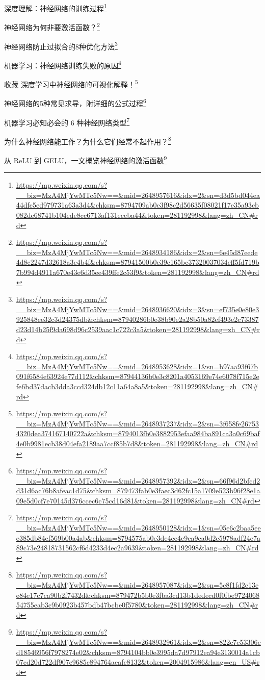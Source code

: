 \documentclass[]{ctexbook}
\renewcommand{\href}[2]{#2\footnote{\url{#1}}}
\begin{document}
\href{https://mp.weixin.qq.com/s?__biz=MzA4MjYwMTc5Nw==\&mid=2648957616\&idx=2\&sn=d3d5bd044ea44dfc5ed979731a63a3d4\&chksm=8794709ab0e3f98c2d56635f08021f17e35a93cb082de68741b104ede8cc6713af131eceba44\&token=281192998\&lang=zh_CN\#rd}{深度理解：神经网络的训练过程}

\href{https://mp.weixin.qq.com/s?__biz=MzA4MjYwMTc5Nw==\&mid=2648934186\&idx=2\&sn=6e45d87eede4d8c2247d32618a3c4b4f\&chksm=87941500b0e39c165bc37320037034cff5fd719b7b994d4911a670e43e6d35ee439ffe2c53f9\&token=281192998\&lang=zh_CN\#rd}{神经网络为何非要激活函数？}

\href{https://mp.weixin.qq.com/s?__biz=MzA4MjYwMTc5Nw==\&mid=2648936620\&idx=3\&sn=ef735e0e80e3925848ee32c3d24375db\&chksm=87940286b0e38b90e2a28b50a82ef493e2c73387d23d14b25f9da698d96c2539aac1c722c3a5\&token=281192998\&lang=zh_CN\#rd}{神经网络防止过拟合的8种优化方法}

\href{https://mp.weixin.qq.com/s?__biz=MzA4MjYwMTc5Nw==\&mid=2648953628\&idx=1\&sn=b97aa93f67b091f6584e63924e77d112\&chksm=87944136b0e3c8201a4053169e74e6078f715e2efe6bd37dacb3dda3ccd324db12c11a64a8a5\&token=281192998\&lang=zh_CN\#rd}{机器学习：神经网络训练失败的原因}

\href{https://mp.weixin.qq.com/s?__biz=MzA4MjYwMTc5Nw==\&mid=2648937237\&idx=2\&sn=3f658fe267534320dea374167140722a\&chksm=8794013fb0e3882953efaa984ba891ca3a0c69baf4e0b9981ecb38d04efa2189aa7ccf85b7d8\&token=281192998\&lang=zh_CN\#rd}{收藏 \textbar{} 深度学习中神经网络的可视化解释！}

\href{https://mp.weixin.qq.com/s?__biz=MzA4MjYwMTc5Nw==\&mid=2648957392\&idx=2\&sn=66f96d2bfcd2d31d6ac76b8afeac1d75\&chksm=879473fab0e3faec3d62fc15a1709e523b96f28e1a09e5d0cf7e70145d376ccec6c75cd16d81\&token=281192998\&lang=zh_CN\#rd}{神经网络的5种常见求导，附详细的公式过程}

\href{https://mp.weixin.qq.com/s?__biz=MzA4MjYwMTc5Nw==\&mid=2648950128\&idx=1\&sn=05e6c2baa5eee385db84ef569b00a4ab\&chksm=8794575ab0e3de4ce4e9ca9ca0d2e5978adf24e7a89c73e24818731562cf6d4233d4ec2a9639\&token=281192998\&lang=zh_CN\#rd}{机器学习必知必会的 6 种神经网络类型}

\href{https://mp.weixin.qq.com/s?__biz=MzA4MjYwMTc5Nw==\&mid=2648957087\&idx=2\&sn=5c8f1fd2e13ee84e17c7ca90b2f7432d\&chksm=879472b5b0e3fba3cd13b1dedecd0f0fbe972406854755eab3c9b0923b457bdb47bcbe0f5780\&token=281192998\&lang=zh_CN\#rd}{为什么神经网络能工作？为什么它们经常不起作用？}

\href{https://mp.weixin.qq.com/s?__biz=MzA4MjYwMTc5Nw==\&mid=2648932961\&idx=2\&sn=822c7c53306cd18546956f7978274e02\&chksm=8794104bb0e3995da7d97912ea94e3130014a1cb07cd20d722df907e9685c894764aeafc8132\&token=2004915986\&lang=en_US\#rd}{从 ReLU 到 GELU，一文概览神经网络的激活函数}
\end{document}
